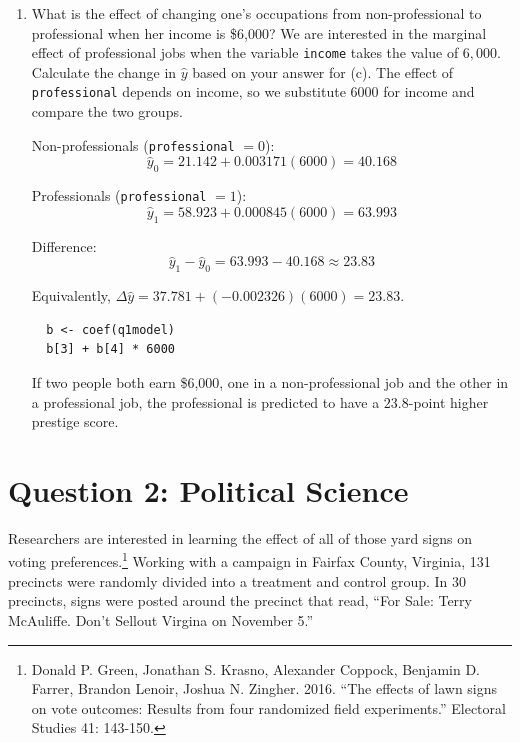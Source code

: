 \documentclass[12pt,letterpaper]{article}
\begin{document}
\begin{enumerate}
  \noindent Example: at \$2,000, $58.923 + 0.000845(2000) = 60.613$; at \$3,000, $58.923 + 0.000845(3000) = 61.458$. The difference is $61.458 - 60.613 = 0.845$.
  
  \begin{lstlisting}
  b <- coef(q1model)
  1000 * (b[2] + b[4])
  \end{lstlisting}
  
  A \$1,000 increase in income raises predicted prestige by about $0.85$ points for professionals.
  	\vspace{10cm}
  	
  	
	\item [(g)]
	What is the effect of changing one's occupations from non-professional to professional when her income is \$6,000? We are interested in the marginal effect of professional jobs when the variable \texttt{income} takes the value of $6,000$. Calculate the change in $\hat{y}$ based on your answer for (c).
	The effect of \texttt{professional} depends on income, so we substitute $6000$ for income and compare the two groups.

  \noindent Non-professionals (\texttt{professional} $=0$):
  \[
  \hat{y}_0 = 21.142 + 0.003171(6000) = 40.168
  \]
  
  \noindent Professionals (\texttt{professional} $=1$):
  \[
  \hat{y}_1 = 58.923 + 0.000845(6000) = 63.993
  \]
  
  \noindent Difference:
  \[
  \hat{y}_1 - \hat{y}_0 = 63.993 - 40.168 \approx 23.83
  \]
  
  Equivalently, $\Delta\hat{y} = 37.781 + (-0.002326)(6000) = 23.83$.
  
  \begin{lstlisting}
  b <- coef(q1model)
  b[3] + b[4] * 6000
  \end{lstlisting}
  
  If two people both earn \$6,000, one in a non-professional job and the other in a professional job, the professional is predicted to have a $23.8$-point higher prestige score.
  	
  \end{enumerate}

\newpage

\section*{Question 2: Political Science}
\vspace{.25cm}
\noindent 	Researchers are interested in learning the effect of all of those yard signs on voting preferences.\footnote{Donald P. Green, Jonathan	S. Krasno, Alexander Coppock, Benjamin D. Farrer,	Brandon Lenoir, Joshua N. Zingher. 2016. ``The effects of lawn signs on vote outcomes: Results from four randomized field experiments.'' Electoral Studies 41: 143-150. } Working with a campaign in Fairfax County, Virginia, 131 precincts were randomly divided into a treatment and control group. In 30 precincts, signs were posted around the precinct that read, ``For Sale: Terry McAuliffe. Don't Sellout Virgina on November 5.'' \\
\end{document}
